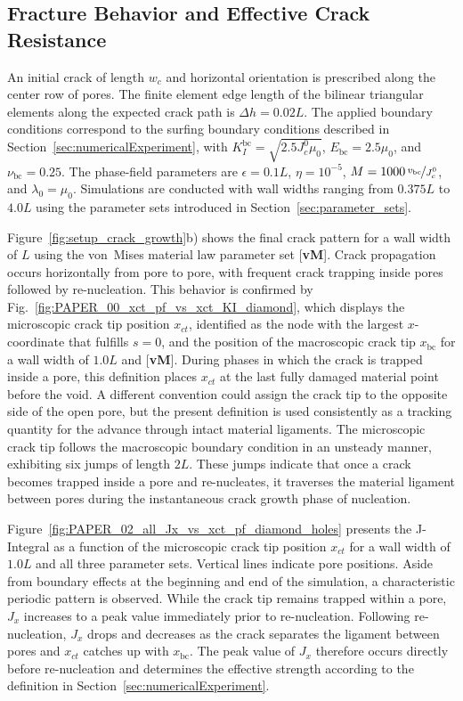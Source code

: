 \documentclass[pdflatex,sn-mathphys-num]{sn-jnl}%
\newcommand{\vMLabel}{[\textbf{vM}]\xspace}
\theoremstyle{thmstyleone}%
\theoremstyle{thmstyletwo}%
\theoremstyle{thmstylethree}%
\begin{document}
\subsection{Fracture Behavior and Effective Crack Resistance}
\label{sec:2D_fracture_behavior}

An initial crack of length $w_c$ and horizontal orientation is prescribed along the center row of pores. The finite element edge length of the bilinear triangular elements along the expected crack path is $\Delta h = 0.02L$. The applied boundary conditions correspond to the surfing boundary conditions described in Section~\ref{sec:numericalExperiment}, with $K_I^{\text{bc}} = \sqrt{2.5 J_c^0 \mu_0}$, $E_{\text{bc}} = 2.5 \mu_0$, and $\nu_{\text{bc}} = 0.25$. The phase-field parameters are $\epsilon = 0.1L$, $\eta = 10^{-5}$, $M = 1000\,\nicefrac{v_{\text{bc}}}{J_c^0}$, and $\lambda_0 = \mu_0$. Simulations are conducted with wall widths ranging from $0.375L$ to $4.0L$ using the parameter sets introduced in Section~\ref{sec:parameter_sets}.

Figure~\ref{fig:setup_crack_growth}b) shows the final crack pattern for a wall width of $L$ using the von~Mises material law parameter set \vMLabel. Crack propagation occurs horizontally from pore to pore, with frequent crack trapping inside pores followed by re-nucleation. This behavior is confirmed by Fig.~\ref{fig:PAPER_00_xct_pf_vs_xct_KI_diamond}, which displays the microscopic crack tip position $x_{ct}$, identified as the node with the largest $x$-coordinate that fulfills $s=0$, and the position of the macroscopic crack tip $x_{\text{bc}}$ for a wall width of $1.0L$ and \vMLabel. During phases in which the crack is trapped inside a pore, this definition places $x_{ct}$ at the last fully damaged material point before the void. A different convention could assign the crack tip to the opposite side of the open pore, but the present definition is used consistently as a tracking quantity for the advance through intact material ligaments. The microscopic crack tip follows the macroscopic boundary condition in an unsteady manner, exhibiting six jumps of length $2L$. These jumps indicate that once a crack becomes trapped inside a pore and re-nucleates, it traverses the material ligament between pores during the instantaneous crack growth phase of nucleation.

Figure~\ref{fig:PAPER_02_all_Jx_vs_xct_pf_diamond_holes} presents the J-Integral as a function of the microscopic crack tip position $x_{ct}$ for a wall width of $1.0L$ and all three parameter sets. Vertical lines indicate pore positions. Aside from boundary effects at the beginning and end of the simulation, a characteristic periodic pattern is observed. While the crack tip remains trapped within a pore, $J_x$ increases to a peak value immediately prior to re-nucleation. Following re-nucleation, $J_x$ drops and decreases as the crack separates the ligament between pores and $x_{ct}$ catches up with $x_{\text{bc}}$. The peak value of $J_x$ therefore occurs directly before re-nucleation and determines the effective strength according to the definition in Section~\ref{sec:numericalExperiment}.
\end{document}
